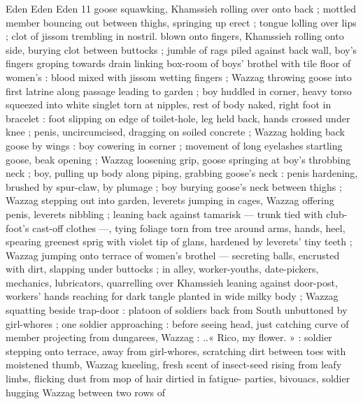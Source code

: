 Eden Eden Eden 11
goose squawking, Khamssieh rolling over onto back ; mottled
member bouncing out between thighs, springing up erect ; tongue
lolling over lips ; clot of jissom trembling in nostril. blown onto
fingers, Khamssieh rolling onto side, burying clot between buttocks ;
jumble of rags piled against back wall, boy's fingers groping towards
drain linking box-room of boys’ brothel with tile floor of women’s :
blood mixed with jissom wetting fingers ; Wazzag throwing goose into
first latrine along passage leading to garden ; boy huddled in corner,
heavy torso squeezed into white singlet torn at nipples, rest of body
naked, right foot in bracelet : foot slipping on edge of toilet-hole, leg
held back, hands crossed under knee ; penis, uncircumcised,
dragging on soiled concrete ; Wazzag holding back goose by wings :
boy cowering in corner ; movement of long eyelashes startling
goose, beak opening ; Wazzag loosening grip, goose springing at
boy's throbbing neck ; boy, pulling up body along piping, grabbing
goose’s neck : penis hardening, brushed by spur-claw, by plumage ;
boy burying goose’s neck between thighs ; Wazzag stepping out into
garden, leverets jumping in cages, Wazzag offering penis, leverets
nibbling ; leaning back against tamarisk — trunk tied with club-foot's
cast-off clothes —, tying foliage torn from tree around arms, hands,
heel, spearing greenest sprig with violet tip of glans, hardened by
leverets’ tiny teeth ; Wazzag jumping onto terrace of women's
brothel — secreting balls, encrusted with dirt, slapping under
buttocks ; in alley, worker-youths, date-pickers, mechanics,
lubricators, quarrelling over Khamssieh leaning against door-post,
workers’ hands reaching for dark tangle planted in wide milky body
; Wazzag squatting beside trap-door : platoon of soldiers back from
South unbuttoned by girl-whores ; one soldier approaching : before
seeing head, just catching curve of member projecting from
dungarees, Wazzag : ..« Rico, my flower. » : soldier stepping onto
terrace, away from girl-whores, scratching dirt between toes with
moistened thumb, Wazzag kneeling, fresh scent of insect-seed rising
from leafy limbs, flicking dust from mop of hair dirtied in fatigue-
parties, bivouacs, soldier hugging Wazzag between two rows of


